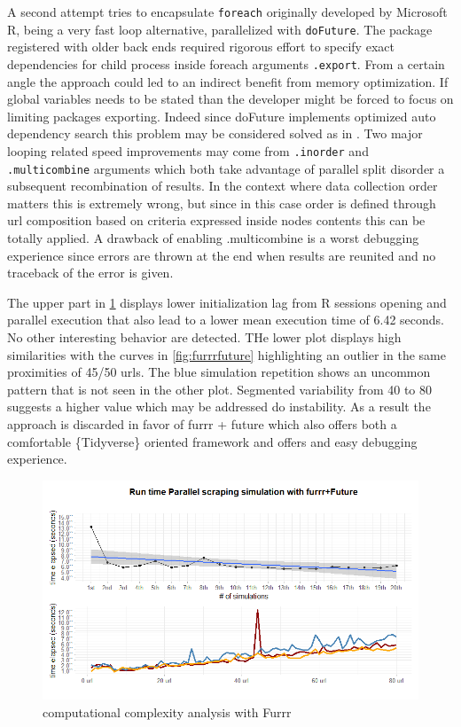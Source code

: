 \documentclass[
  12pt,
  a4paper,
  oneside]{book}
\newcommand{\passthrough}[1]{#1}
\theoremstyle{definition}
\theoremstyle{definition}
\theoremstyle{definition}
\theoremstyle{remark}
\begin{document}
A second attempt tries to encapsulate \passthrough{\lstinline!foreach!} \citep{foreach} originally developed by Microsoft R, being a very fast loop alternative, parallelized with \passthrough{\lstinline!doFuture!}. The package registered with older back ends required rigorous effort to specify exact dependencies for child process inside foreach arguments \passthrough{\lstinline!.export!}. From a certain angle the approach could led to an indirect benefit from memory optimization. If global variables needs to be stated than the developer might be forced to focus on limiting packages exporting. Indeed since doFuture implements optimized auto dependency search this problem may be considered solved as in \citet{doFuture}. Two major looping related speed improvements may come from \passthrough{\lstinline!.inorder!} and \passthrough{\lstinline!.multicombine!} arguments which both take advantage of parallel split disorder a subsequent recombination of results. In the context where data collection order matters this is extremely wrong, but since in this case order is defined through url composition based on criteria expressed inside nodes contents this can be totally applied. A drawback of enabling .multicombine is a worst debugging experience since errors are thrown at the end when results are reunited and no traceback of the error is given.

The upper part in \ref{fig:foreachdofuture} displays lower initialization lag from R sessions opening and parallel execution that also lead to a lower mean execution time of 6.42 seconds. No other interesting behavior are detected.
THe lower plot displays high similarities with the curves in \ref{fig:furrrfuture} highlighting an outlier in the same proximities of 45/50 urls. The blue simulation repetition shows an uncommon pattern that is not seen in the other plot. Segmented variability from 40 to 80 suggests a higher value which may be addressed do instability. As a result the approach is discarded in favor of furrr + future which also offers both a comfortable \{Tidyverse\} oriented framework and offers and easy debugging experience.

\begin{figure}
\centering
\includegraphics{images/simulations/final_foreach_dofuture.png}
\caption{\label{fig:foreachdofuture}computational complexity analysis with Furrr}
\end{figure}
\end{document}
